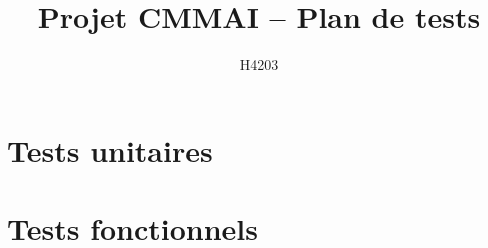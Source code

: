 \documentclass[11pt, a4paper]{article}
\title{Projet CMMAI -- Plan de tests}
\author{H4203}
\date{}
\begin{document}
\maketitle
\tableofcontents

\part{Tests unitaires}





\newpage
\part{Tests fonctionnels}
\setcounter{testno}{0}

\end{document}
